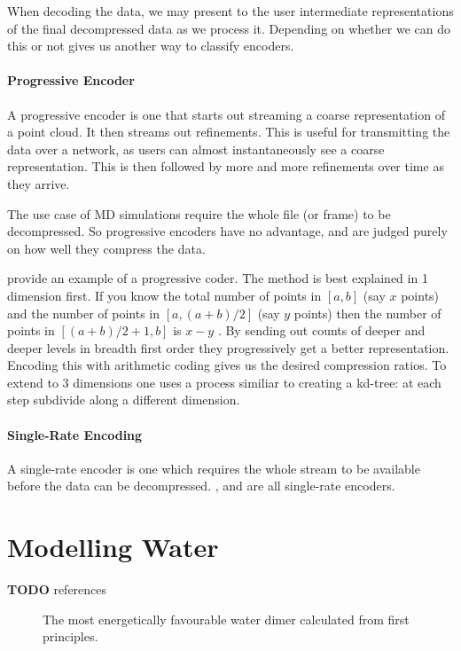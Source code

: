 \documentclass{report}
\newcommand{\todo}{\textbf{TODO} }
\begin{document}
When decoding the data, we may present to the user intermediate
representations of the final decompressed data as we process it. Depending on
whether we can do this or not gives us another way to classify encoders.

\paragraph{Progressive Encoder}
A progressive encoder is one that starts out streaming a coarse representation
of a point cloud. It then streams out refinements. This is useful for
transmitting the data over a network, as users can almost instantaneously see
a coarse representation. This is then followed by more and more refinements
over time as they arrive.

The use case of MD simulations require the whole file (or frame) to be
decompressed. So progressive encoders have no advantage, and are judged purely
on how well they compress the data.

\citet{devillers2000gci} provide an example of a progressive coder. The method
is best explained in 1 dimension first. If you know the total number of points
in $[a, b]$ (say $x$ points) and the number of points in $[a, (a+b)/2]$ (say
$y$ points) then the number of points in $[(a+b)/2+1, b]$ is $x - y$ . By
sending out counts of deeper and deeper levels in breadth first order they
progressively get a better representation. Encoding this with arithmetic
coding gives us the desired compression ratios. To extend to 3 dimensions one
uses a process similiar to creating a kd-tree: at each step subdivide along a
different dimension.

\paragraph{Single-Rate Encoding}
A single-rate encoder is one which requires the whole stream to be available
before the data can be decompressed. \citet{omeltchenko2000sls},
\citet{gumholdcomp} and \citet{merrycomp} are all single-rate encoders.


\section{Modelling Water}

\todo references

\begin{figure}[h]
\centering
{}
\caption{The most energetically favourable water dimer calculated from first
  principles.}
\label{fig:dimer}
\end{figure}
\end{document}
